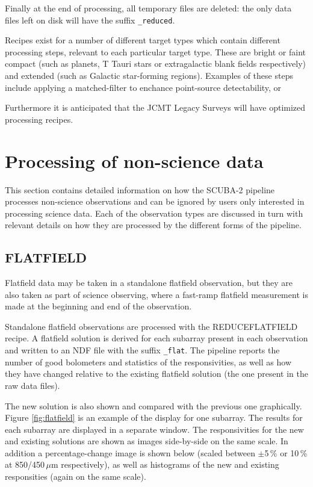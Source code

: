 \documentclass[twoside,11pt]{article}
\newcommand{\xlabel}[1]{}
\renewcommand{\_}{\texttt{\symbol{95}}}
\newcommand{\task}[1]{\textsf{#1}}
\begin{document}
Finally at the end of processing, all temporary files are deleted: the
only data files left on disk will have the suffix \verb+_reduced+.

Recipes exist for a number of different target types which contain
different processing steps, relevant to each particular target
type. These are bright or faint compact (such as planets, T Tauri
stars or extragalactic blank fields respectively) and extended (such
as Galactic star-forming regions). Examples of these steps include
applying a matched-filter to enchance point-source detectability, or

Furthermore it is anticipated that the JCMT Legacy Surveys will have
optimized processing recipes.

\section{\xlabel{nonscience}Processing of non-science data\label{se:nonsci}}

This section contains detailed information on how the SCUBA-2 pipeline
processes non-science observations and can be ignored by users only
interested in processing science data. Each of the observation types
are discussed in turn with relevant details on how they are processed
by the different forms of the pipeline.

\subsection{FLATFIELD}

Flatfield data may be taken in a standalone flatfield observation, but
they are also taken as part of science observing, where a fast-ramp
flatfield measurement is made at the beginning and end of the
observation.

Standalone flatfield observations are processed with the
\task{REDUCE\_FLATFIELD} recipe. A flatfield solution is derived for
each subarray present in each observation and written to an NDF file
with the suffix \verb+_flat+. The pipeline reports the number of good
bolometers and statistics of the responsivities, as well as how they
have changed relative to the existing flatfield solution (the one
present in the raw data files).

The new solution is also shown and compared with the previous one
graphically. Figure \ref{fig:flatfield} is an example of the display
for one subarray. The results for each subarray are displayed in a
separate window. The responsivities for the new and existing solutions
are shown as images side-by-side on the same scale. In addition a
percentage-change image is shown below (scaled between $\pm$5\,\% or
10\,\% at 850/450\,$\mu$m respectively), as well as histograms of the
new and existing responsities (again on the same scale).
\end{document}
